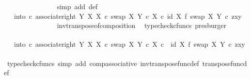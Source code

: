 \begin{isabellebody}
\ \ \ \ \ \ \ \ \ \ \ \ \ \ \isamarkupfalse%
\ {\isacharparenleft}{\kern0pt}simp\ add{\isacharcolon}{\kern0pt}\ {\isasymTheta}{\isacharunderscore}{\kern0pt}def{\isacharparenright}{\kern0pt}\isanewline
\ \ \ \ \ \ \ \ \ \ \ \ \isamarkupfalse%
\ \isamarkupfalse%
\ {\isachardoublequoteopen}{\isachardot}{\kern0pt}{\isachardot}{\kern0pt}{\isachardot}{\kern0pt}\ {\isacharequal}{\kern0pt}\ {\isacharparenleft}{\kern0pt}{\isacharparenleft}{\kern0pt}into\ {\isasymcirc}\isactrlsub c\ associate{\isacharunderscore}{\kern0pt}right\ Y\ X\ X\ {\isasymcirc}\isactrlsub c\ swap\ X\ {\isacharparenleft}{\kern0pt}Y\ {\isasymtimes}\isactrlsub c\ X{\isacharparenright}{\kern0pt}{\isacharparenright}{\kern0pt}\isactrlsup {\isasymsharp}\isactrlsup {\isasymflat}\ {\isasymcirc}\isactrlsub c\ {\isacharparenleft}{\kern0pt}id\ X\ {\isasymtimes}\isactrlsub f\ swap\ X\ Y{\isacharparenright}{\kern0pt}{\isacharparenright}{\kern0pt}\ {\isasymcirc}\isactrlsub c\ {\isasymlangle}z{\isacharcomma}{\kern0pt}{\isasymlangle}x{\isacharcomma}{\kern0pt}y{\isasymrangle}{\isasymrangle}{\isachardoublequoteclose}\isanewline
\ \ \ \ \ \ \ \ \ \ \ \ \ \ \isamarkupfalse%
\ inv{\isacharunderscore}{\kern0pt}transpose{\isacharunderscore}{\kern0pt}of{\isacharunderscore}{\kern0pt}composition\ \isamarkupfalse%
\ {\isacharparenleft}{\kern0pt}typecheck{\isacharunderscore}{\kern0pt}cfuncs{\isacharcomma}{\kern0pt}\ presburger{\isacharparenright}{\kern0pt}\isanewline
\ \ \ \ \ \ \ \ \ \ \ \ \isamarkupfalse%
\ \isamarkupfalse%
\ {\isachardoublequoteopen}{\isachardot}{\kern0pt}{\isachardot}{\kern0pt}{\isachardot}{\kern0pt}\ {\isacharequal}{\kern0pt}\ {\isacharparenleft}{\kern0pt}into\ {\isasymcirc}\isactrlsub c\ associate{\isacharunderscore}{\kern0pt}right\ Y\ X\ X\ {\isasymcirc}\isactrlsub c\ swap\ X\ {\isacharparenleft}{\kern0pt}Y\ {\isasymtimes}\isactrlsub c\ X{\isacharparenright}{\kern0pt}{\isacharparenright}{\kern0pt}\ {\isasymcirc}\isactrlsub c\ \ {\isacharparenleft}{\kern0pt}id\ X\ {\isasymtimes}\isactrlsub f\ swap\ X\ Y{\isacharparenright}{\kern0pt}\ {\isasymcirc}\isactrlsub c\ {\isasymlangle}z{\isacharcomma}{\kern0pt}{\isasymlangle}x{\isacharcomma}{\kern0pt}y{\isasymrangle}{\isasymrangle}{\isachardoublequoteclose}\isanewline
\ \ \ \ \ \ \ \ \ \ \ \ \ \ \isamarkupfalse%
\ {\isacharparenleft}{\kern0pt}typecheck{\isacharunderscore}{\kern0pt}cfuncs{\isacharcomma}{\kern0pt}\ simp\ add{\isacharcolon}{\kern0pt}\ comp{\isacharunderscore}{\kern0pt}associative{}\ inv{\isacharunderscore}{\kern0pt}transpose{\isacharunderscore}{\kern0pt}func{\isacharunderscore}{\kern0pt}def{}\ transpose{\isacharunderscore}{\kern0pt}func{\isacharunderscore}{\kern0pt}def{\isacharparenright}{\kern0pt}\isanewline

\end{isabellebody}
